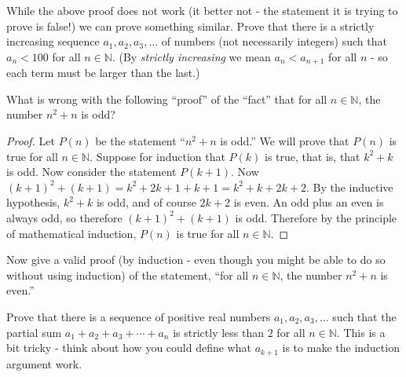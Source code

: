\documentclass[10pt]{exam}
\def\N{\mathbb{N}}
\begin{document}
\begin{questions}
\question While the above proof does not work (it better not - the statement it is trying to prove is false!)  we can prove something similar.  Prove that there is a strictly increasing sequence $a_1, a_2, a_3, \ldots$ of numbers (not necessarily integers) such that $a_n < 100$ for all $n \in \N$.  (By {\em strictly increasing} we mean $a_n < a_{n+1}$ for all $n$ - so each term must be larger than the last.)


\question What is wrong with the following ``proof'' of the ``fact'' that for all $n \in \N$, the number $n^2 + n$ is odd?
  \begin{proof}
    Let $P(n)$ be the statement ``$n^2 + n$ is odd.''  We will prove that $P(n)$ is true for all $n \in \N$.  Suppose for induction that $P(k)$ is true, that is, that $k^2 + k$ is odd.  Now consider the statement $P(k+1)$.  Now $(k+1)^2 + (k+1) = k^2 + 2k + 1 + k + 1 = k^2 + k + 2k + 2$.  By the inductive hypothesis, $k^2 + k$ is odd, and of course $2k + 2$ is even.  An odd plus an even is always odd, so therefore $(k+1)^2 + (k+1)$ is odd.  Therefore by the principle of mathematical induction, $P(n)$ is true for all $n \in \N$.
  \end{proof}

\question Now give a valid proof (by induction - even though you might be able to do so without using induction) of the statement, ``for all $n \in \N$, the number $n^2 + n$ is even.''

\question Prove that there is a sequence of positive real numbers $a_1, a_2, a_3, \ldots$ such that the partial sum $a_1 + a_2 + a_3 + \cdots + a_n$ is strictly less than $2$ for all $n \in \N$.  This is a bit tricky - think about how you could define what $a_{k+1}$ is to make the induction argument work.
 
\end{questions}
\end{document}
